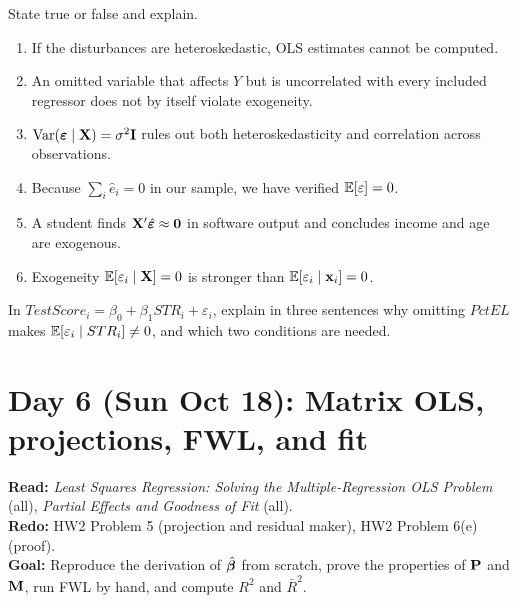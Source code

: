 \documentclass[11pt]{article}
\begin{document}
State true or false and explain.
\begin{enumerate}[label=(\alph*)]
  \item If the disturbances are heteroskedastic, OLS estimates cannot be computed.
  \item An omitted variable that affects $Y$ but is uncorrelated with every included regressor does not by itself violate exogeneity.
  \item $\operatorname{Var}(\bm{\varepsilon}\mid\mathbf{X})=\sigma^2\mathbf{I}$ rules out both heteroskedasticity and correlation across observations.
  \item Because $\sum_i\hat e_i=0$ in our sample, we have verified $\mathbb{E}[\varepsilon]=0$.
  \item A student finds $\mathbf{X}'\hat{\bm{\varepsilon}}\approx\mathbf0$ in software output and concludes income and age are exogenous.
  \item Exogeneity $\mathbb{E}[\varepsilon_i\mid\mathbf{X}]=0$ is stronger than $\mathbb{E}[\varepsilon_i\mid\mathbf x_i]=0$.
\end{enumerate}

In $TestScore_i=\beta_0+\beta_1STR_i+\varepsilon_i$, explain in three sentences why omitting $PctEL$ makes $\mathbb{E}[\varepsilon_i\mid STR_i]\ne0$, and which two conditions are needed.

\clearpage
\section{Day 6 (Sun Oct 18): Matrix OLS, projections, FWL, and fit}

\begin{planbox}
\textbf{Read:} \emph{Least Squares Regression: Solving the Multiple-Regression OLS Problem} (all), \emph{Partial Effects and Goodness of Fit} (all).\\
\textbf{Redo:} HW2 Problem 5 (projection and residual maker), HW2 Problem 6(e) (proof).\\
\textbf{Goal:} Reproduce the derivation of $\hat{\bm{\beta}}$ from scratch, prove the properties of $\mathbf{P}$ and $\mathbf{M}$, run FWL by hand, and compute $R^2$ and $\bar R^2$.
\end{planbox}
\end{document}
